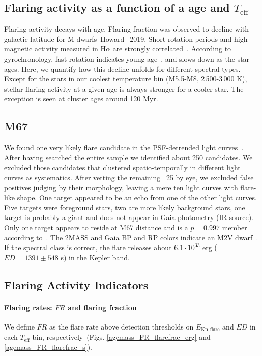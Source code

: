 \documentclass{aa}
\begin{document}
\subsection{Flaring activity as a function of a age and $T_\mathrm{eff}$}
Flaring activity decays with age. Flaring fraction was observed to decline with galactic latitude for M dwarfs~\citep{hilton_dwarf_2010}Howard+2019. Short rotation periods and high magnetic activity measured in H$\alpha$ are strongly correlated~\citep{west_magneticrotationage_2015}. According to gyrochronology, fast rotation indicates young age~\citep{barnes_rotational_2003}, and slows down as the star ages. Here, we quantify how this decline unfolds for different spectral types. Except for the stars in our coolest temperature bin (M5.5-M8, 2\,500-3\,000 K), stellar flaring activity at a given age is always stronger for a cooler star. The exception is seen at cluster ages around 120 Myr.
\subsection{M67}
We found one very likely flare candidate in the PSF-detrended light curves~\citep{nardiello_m67psf_2016}. After having searched the entire sample we identified about 250 candidates. We excluded those candidates that clustered spatio-temporally in different light curves as systematics. After vetting the remaining ~25 by eye, we excluded false positives judging by their morphology, leaving a mere ten light curves with flare-like shape. One target appeared to be an echo from one of the other light curves. Five targets were foreground stars, two are more likely background stars, one target is probably a giant and does not appear in Gaia photometry (IR source). Only one target appears to reside at M67 distance and is a $p=0.997$ member according to~\citet{gao_mlm67members_2018}. The 2MASS and Gaia BP and RP colors indicate an M2V dwarf~\citep{pecaut_intrinsic_2013}. If  the spectral class is correct, the flare releases about $6.1\cdot 10^{33}$ erg ($ED=1391\pm548$ s) in the Kepler band.
\subsection{Flaring Activity Indicators}
\paragraph{Flaring rates: $FR$ and flaring fraction}
We define $FR$ as the flare rate above detection thresholds on $E_\mathrm{Kp,flare}$ and $ED$ in each $T_\mathrm{eff}$ bin, respectively~(Figs. \ref{agemass_FR_flarefrac_erg} and \ref{agemass_FR_flarefrac_s}).
\end{document}
